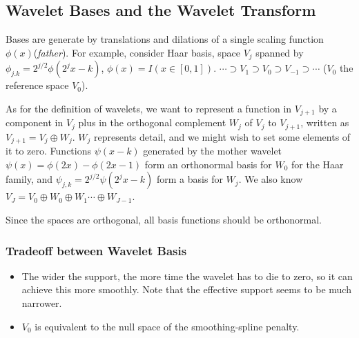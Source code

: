 \subsection{Wavelet Bases and the Wavelet Transform}
Bases are generate by translations and dilations of a single scaling function $\phi(x)$(\textit{father}). 
For example, consider Haar basis, space $V_j$ spanned by $\phi_{j.k}=2^{j/2}\phi(2^jx-k)$, 
$\phi(x)=I(x \in[0,1])$. $\cdots \supset V_{1} \supset V_{0} \supset V_{-1} \supset 
\cdots$ ($V_0$ the reference space $V_0$). 

As for the definition of wavelets, we want to represent a function in $V_{j+1}$ by a component in 
$V_j$ plus in the orthogonal complement $W_j$ of $V_j$ to $V_{j+1}$, written as $V_{j+1}=V_{j} \oplus W_{j}$. 
$W_j$ represents detail, and we might wish to set some elements of it to zero. 
Functions $\psi(x-k)$ generated by the mother wavelet $\psi(x)=\phi(2x)-\phi(2x-1)$ form an orthonormal
basis for $W_0$ for the Haar family, and $\psi_{j, k}=2^{j / 2} \psi\left(2^{j} x-k\right)$ form
a basis for $W_j$. 
We also know $V_{J}=V_{0} \oplus W_{0} \oplus W_{1} \cdots \oplus W_{J-1}$. 

Since the spaces are orthogonal, all basis functions should be orthonormal. 

\subsubsection{Tradeoff between Wavelet Basis}
\begin{itemize}
\item The wider the support, the more time the wavelet has to die to zero, so it can achieve this more
smoothly. Note that the effective support seems to be much narrower.
\item $V_0$ is equivalent to the null space of the smoothing-spline penalty. 
\end{itemize}

